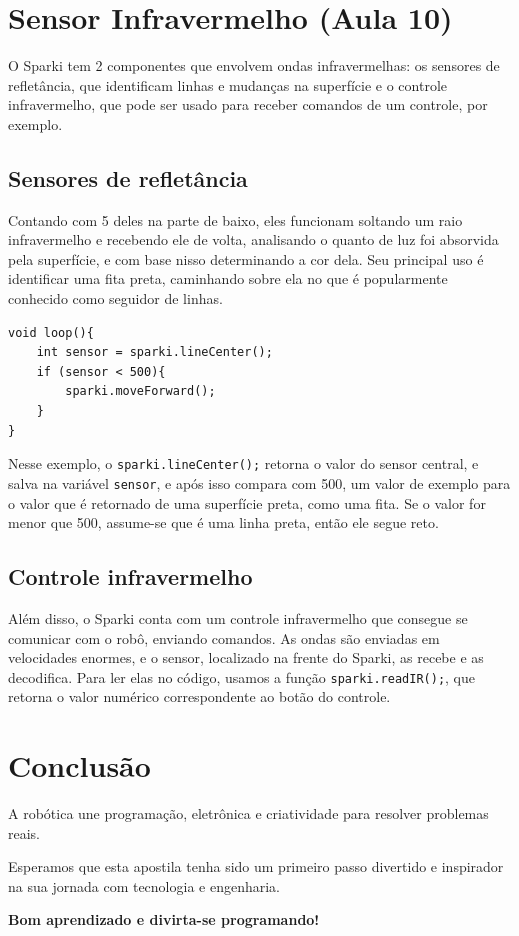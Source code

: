 \documentclass[conference]{IEEEtran}
\begin{document}
\section{Sensor Infravermelho (Aula 10)}
O Sparki tem 2 componentes que envolvem ondas infravermelhas: os sensores de refletância, que identificam linhas e mudanças na superfície e o controle infravermelho, que pode ser usado para receber comandos de um controle, por exemplo.
\subsection{Sensores de refletância}
Contando com 5 deles na parte de baixo, eles funcionam soltando um raio infravermelho e recebendo ele de volta, analisando o quanto de luz foi absorvida pela superfície, e com base nisso determinando a cor dela. Seu principal uso é identificar uma fita preta, caminhando sobre ela no que é popularmente conhecido como seguidor de linhas.
\begin{lstlisting}[caption={seguidor de linhas(básico)}]
void loop(){
    int sensor = sparki.lineCenter();
    if (sensor < 500){
        sparki.moveForward();
    }
}
\end{lstlisting}

Nesse exemplo, o \texttt{sparki.lineCenter();} retorna o valor do sensor central, e salva na variável \texttt{sensor}, e após isso compara com 500, um valor de exemplo para o valor que é retornado de uma superfície preta, como uma fita. Se o valor for menor que 500, assume-se que é uma linha preta, então ele segue reto.

\subsection{Controle infravermelho}
Além disso, o Sparki conta com um controle infravermelho que consegue se comunicar com o robô, enviando comandos. As ondas são enviadas em velocidades enormes, e o sensor, localizado na frente do Sparki, as recebe e as decodifica. Para ler elas no código, usamos a função \texttt{sparki.readIR();}, que retorna o valor numérico correspondente ao botão do controle.

\vspace{0.5cm}
\section{Conclusão}

A robótica une programação, eletrônica e criatividade para resolver problemas reais.

Esperamos que esta apostila tenha sido um primeiro passo divertido e inspirador na sua jornada com tecnologia e engenharia.

\vspace{0.4cm}

\begin{center}
\Large
\textbf{Bom aprendizado e divirta-se programando!}
\end{center}
\end{document}
